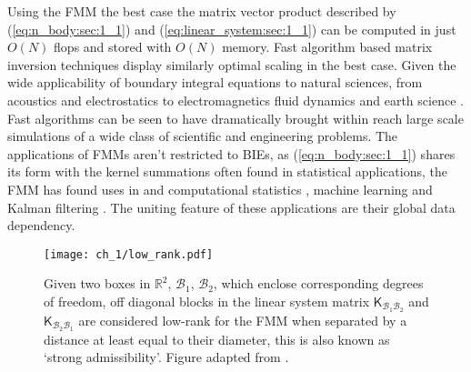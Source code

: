 Using the FMM the best case the matrix vector product described by (\ref{eq:n_body:sec:1_1}) and (\ref{eq:linear_system:sec:1_1}) can be computed in just $O(N)$ \gls{flops} and stored with $O(N)$ memory. Fast algorithm based matrix inversion techniques display similarly optimal scaling in the best case. Given the wide applicability of boundary integral equations to natural sciences, from acoustics \cite{wolf2011aeroacoustic,hao2015efficient} and electrostatics \cite{wang2021high} to electromagnetics \cite{darve2004fast} fluid dynamics \cite{rahimian2010petascale} and earth science \cite{chaillat2008multi}. Fast algorithms can be seen to have dramatically brought within reach large scale simulations of a wide class of scientific and engineering problems. The applications of FMMs aren't restricted to BIEs, as (\ref{eq:n_body:sec:1_1}) shares its form with the kernel summations often found in statistical applications, the FMM has found uses in and computational statistics \cite{ambikasaran2013large}, machine learning \cite{lee2012distributed} and Kalman filtering \cite{li2014kalman}. The uniting feature of these applications are their global data dependency. 

\begin{figure}
    \centering
    \texttt{[image: ch\_1/low\_rank.pdf]}
    \caption{Given two boxes in $\mathbb{R}^2$, $\mathcal{B}_1$, $\mathcal{B}_2$, which enclose corresponding degrees of freedom, off diagonal blocks in the linear system matrix $\mathsf{K}_{\mathcal{B}_1\mathcal{B}_2}$ and $\mathsf{K}_{\mathcal{B}_2\mathcal{B}_1}$ are considered low-rank for the FMM when separated by a distance at least equal to their diameter, this is also known as `strong admissibility'. Figure adapted from \cite{minden2017recursive}.}
    \label{fig:low_rank:sec_1_1}
\end{figure}

